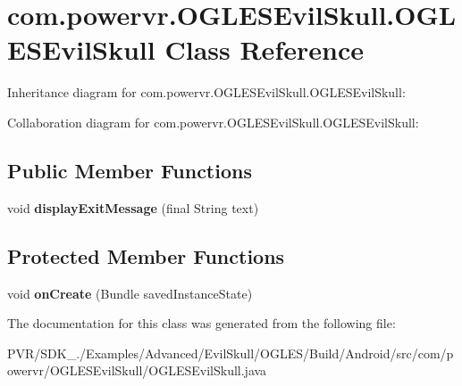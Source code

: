 \hypertarget{classcom_1_1powervr_1_1_o_g_l_e_s_evil_skull_1_1_o_g_l_e_s_evil_skull}{\section{com.\+powervr.\+O\+G\+L\+E\+S\+Evil\+Skull.\+O\+G\+L\+E\+S\+Evil\+Skull Class Reference}
\label{classcom_1_1powervr_1_1_o_g_l_e_s_evil_skull_1_1_o_g_l_e_s_evil_skull}
}


Inheritance diagram for com.\+powervr.\+O\+G\+L\+E\+S\+Evil\+Skull.\+O\+G\+L\+E\+S\+Evil\+Skull\+:


Collaboration diagram for com.\+powervr.\+O\+G\+L\+E\+S\+Evil\+Skull.\+O\+G\+L\+E\+S\+Evil\+Skull\+:
\subsection*{Public Member Functions}
\begin{DoxyCompactItemize}
\item 
\hypertarget{classcom_1_1powervr_1_1_o_g_l_e_s_evil_skull_1_1_o_g_l_e_s_evil_skull_abb40385c3472c5ef0c402237dc4f2eb3}{void {\bfseries display\+Exit\+Message} (final String text)}\label{classcom_1_1powervr_1_1_o_g_l_e_s_evil_skull_1_1_o_g_l_e_s_evil_skull_abb40385c3472c5ef0c402237dc4f2eb3}

\end{DoxyCompactItemize}
\subsection*{Protected Member Functions}
\begin{DoxyCompactItemize}
\item 
\hypertarget{classcom_1_1powervr_1_1_o_g_l_e_s_evil_skull_1_1_o_g_l_e_s_evil_skull_a9bdf044d9fa8dbc659a50f551f9ecfdf}{void {\bfseries on\+Create} (Bundle saved\+Instance\+State)}\label{classcom_1_1powervr_1_1_o_g_l_e_s_evil_skull_1_1_o_g_l_e_s_evil_skull_a9bdf044d9fa8dbc659a50f551f9ecfdf}

\end{DoxyCompactItemize}


The documentation for this class was generated from the following file\+:\begin{DoxyCompactItemize}
\item 
P\+V\+R/\+S\+D\+K\+\_./\+Examples/\+Advanced/\+Evil\+Skull/\+O\+G\+L\+E\+S/\+Build/\+Android/src/com/powervr/\+O\+G\+L\+E\+S\+Evil\+Skull/O\+G\+L\+E\+S\+Evil\+Skull.\+java\end{DoxyCompactItemize}
